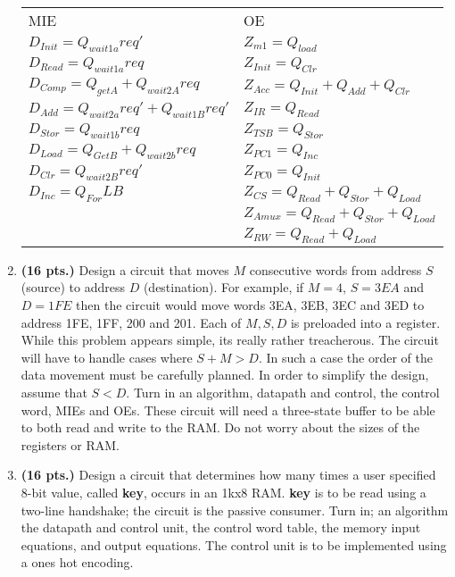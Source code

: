 \begin{enumerate}
\begin{onlysolution}
{\begin{tabular}{ll}
MIE                                     &       OE                      \\
$D_{Init}= Q_{wait1a}req'$            &  $Z_{m1} = Q_{load}$           \\
$D_{Read } = Q_{wait1a}req$             &  $Z_{Init} = Q_{Clr}$           \\
$D_{Comp}= Q_{getA} + Q_{wait2A}req$  &  $Z_{Acc} = Q_{Init} + Q_{Add} + Q_{Clr}$               \\
$D_{Add}= Q_{wait2a}req' + Q_{wait1B}req'$   &  $Z_{IR} = Q_{Read}$     \\
$D_{Stor} = Q_{wait1b}req$             &  $Z_{TSB} = Q_{Stor}$         \\
$D_{Load}= Q_{GetB} + Q_{wait2b}req$  &  $Z_{PC1} = Q_{Inc}$          \\
$D_{Clr  } = Q_{wait2B}req'$            &  $Z_{PC0} = Q_{Init}$          \\
$D_{Inc } = Q_{For}LB$                 &   $Z_{CS} = Q_{Read}+Q_{Stor}+Q_{Load}$     \\
					&   $Z_{Amux} = Q_{Read}+Q_{Stor}+Q_{Load}$   \\
					&   $Z_{RW} = Q_{Read}+Q_{Load}$            \\
\end{tabular}

}\end{onlysolution} 

\item \textbf{ (16 pts.)}
Design a circuit that moves $M$ consecutive words from address $S$ (source) to
address $D$ (destination).  For example, if $M=4$, $S=3EA$ and $D=1FE$ then the 
circuit would move words 3EA, 3EB, 3EC and 3ED to address 1FE, 1FF, 200 and 201.
Each of $M,S,D$ is preloaded into a register.  While this problem appears simple,
its really rather treacherous.  The circuit will have to handle cases where 
$S+M > D$.  In such a case the order of the data movement must be carefully planned.
In order to simplify the design, assume that $S<D$.  Turn in an algorithm, 
datapath and control, the 
control word, MIEs and OEs.  These circuit will need a three-state buffer to
be able to both read and write to the RAM.  Do not worry about the sizes of the
registers or RAM.

\item \textbf{ (16 pts.)}
Design a circuit that determines how many times a user
specified 8-bit value, called \textbf{ key}, occurs in an 1kx8 RAM.  
\textbf{ key} is to be read using a two-line handshake; the circuit 
is the passive consumer.
Turn in; an algorithm
the datapath and control unit,
the control word table,
the memory input equations, and
output equations.  
The control unit is to be implemented using a ones hot encoding.


\end{enumerate}
